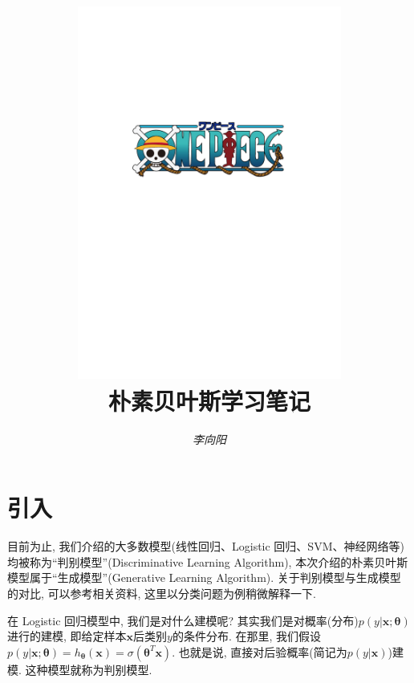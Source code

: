 \documentclass[a4paper,UTF8]{ctexart}
\theoremstyle{plain} \newtheorem{theorem}{定理}[section]
\theoremstyle{plain} \newtheorem{definition}{定义}[section]
\theoremstyle{plain} \newtheorem{lemma}{引理}[section]
\theoremstyle{plain} \newtheorem{proposition}{命题}[section]
\theoremstyle{plain} \newtheorem{example}{例}[section]
\theoremstyle{plain} \newtheorem{remark}{注}[section]
\theoremstyle{plain} \newtheorem{corollary}{推论}[section]
\begin{document}
\title{
\includegraphics[width=0.65\textwidth]{onepiece.pdf}\\
\vspace{2em}
\textbf{朴素贝叶斯学习笔记}}
\author{\emph{李向阳}  }
\date{}


\maketitle
\thispagestyle{empty}

\newpage


\tableofcontents

\newpage

\section{引入}
目前为止, 我们介绍的大多数模型(线性回归、Logistic 回归、SVM、神经网络等)均被称为“判别模型”(Discriminative Learning Algorithm), 本次介绍的朴素贝叶斯模型属于“生成模型”(Generative
Learning Algorithm). 关于判别模型与生成模型的对比, 可以参考相关资料, 这里以分类问题为例稍微解释一下.

在 Logistic 回归模型中, 我们是对什么建模呢? 其实我们是对概率(分布)$p(y | \bm{x}; \bm{\theta})$进行的建模, 即给定样本$\bm{x}$后类别$y$的条件分布. 在那里, 我们假设$p(y | \bm{x}; \bm{\theta}) = h_{\bm{\theta}}(\bm{x}) = \sigma(\bm{\theta}^{T} \bm{x})$. 也就是说, 直接对后验概率(简记为$p(y | \bm{x})$)建模. 这种模型就称为判别模型.
\end{document}
